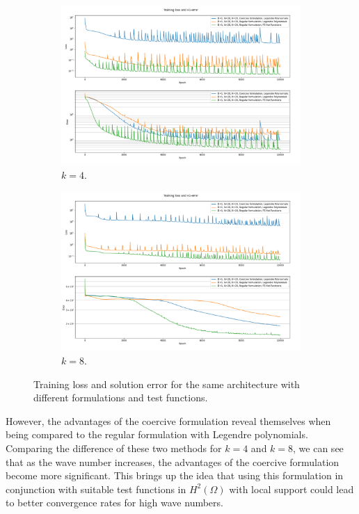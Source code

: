 \begin{figure}[h!]
    \centering
    \begin{subfigure}[b]{0.48\textwidth}
        \includegraphics[width=\textwidth]{img/VPINN-Comparison-HFk4.png}
        \caption{$k=4$.}
        \label{fig:coercivek4}
    \end{subfigure}
    \hfill
    \begin{subfigure}[b]{0.48\textwidth}
        \includegraphics[width=\textwidth]{img/VPINN-Comparison-HFk8.png}
        \caption{$k=8$.}
        \label{fig:coercivek8}
    \end{subfigure}
    \caption{Training loss and solution error for the same architecture with different formulations and test functions.}
    \label{fig:coercive}
\end{figure}

However, the advantages of the coercive formulation reveal themselves when being compared to the regular formulation with Legendre polynomials. Comparing the difference of these two methods for $k=4$ and $k=8$, we can see that as the wave number increases, the advantages of the coercive formulation become more significant. This brings up the idea that using this formulation in conjunction with suitable test functions in $H^2(\Omega)$ with local support could lead to better convergence rates for high wave numbers.


